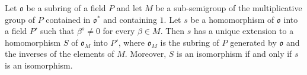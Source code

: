Let $\mathfrak{o}$ be a subring of a field $P$ and let $M$ be a sub-semigroup of the multiplicative group of $P$ contained in $\mathfrak{o}^*$ and containing $1$. Let $s$ be a homomorphism of $\mathfrak{o}$ into a field $P'$ such that $\beta^s \neq 0$ for every $\beta \in M$. Then $s$ has a unique extension to a homomorphism $S$ of $\mathfrak{o}_M$ into $P'$, where $\mathfrak{o}_M$ is the subring of $P$ generated by $\mathfrak{o}$ and the inverses of the elements of $M$. Moreover, $S$ is an isomorphism if and only if $s$ is an isomorphism.
